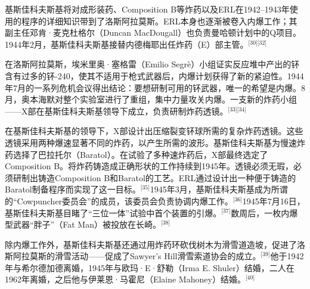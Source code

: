 基斯佳科夫斯基将对成形装药、Composition B等炸药以及ERL在1942–1943年使用的程序的详细知识带到了洛斯阿拉莫斯。ERL本身也逐渐被卷入内爆工作；其副主任邓肯·麦克杜格尔（Duncan MacDougall）也负责曼哈顿计划中的Q项目。1944年2月，基斯佳科夫斯基接替内德梅耶出任炸药（E）部主管。\(^\text{[30][32]}\)

在洛斯阿拉莫斯，埃米里奥·塞格雷（Emilio Segrè）小组证实反应堆中产出的钚含有过多的钚-240，使其不适用于枪式武器后，内爆计划获得了新的紧迫性。1944年7月的一系列危机会议得出结论：要想研制可用的钚武器，唯一的希望是内爆。8月，奥本海默对整个实验室进行了重组，集中力量攻关内爆。一支新的炸药小组——X部在基斯佳科夫斯基领导下成立，负责研制炸药透镜。\(^\text{[33][34]}\)

在基斯佳科夫斯基的领导下，X部设计出压缩裂变钚球所需的复杂炸药透镜。这些透镜采用两种爆速显著不同的炸药，以产生所需的波形。基斯佳科夫斯基为慢速炸药选择了巴拉托尔（Baratol）。在试验了多种速炸药后，X部最终选定了Composition B。将炸药铸造成正确形状的工作持续到1945年。透镜必须无瑕，必须研制出铸造Composition B和Baratol的工艺。ERL通过设计出一种便于铸造的Baratol制备程序而实现了这一目标。\(^\text{[35]}\)1945年3月，基斯佳科夫斯基成为所谓的“Cowpuncher委员会”的成员，该委员会负责协调内爆工作。\(^\text{[36]}\)1945年7月16日，基斯佳科夫斯基目睹了“三位一体”试验中首个装置的引爆。\(^\text{[37]}\)数周后，一枚内爆型武器“胖子”（Fat Man）被投放在长崎。\(^\text{[38]}\)

除内爆工作外，基斯佳科夫斯基还通过用炸药环砍伐树木为滑雪道造坡，促进了洛斯阿拉莫斯的滑雪活动——促成了Sawyer's Hill滑雪索道协会的成立。\(^\text{[39]}\)他于1942年与希尔德加德离婚，1945年与欧玛·E·舒勒（Irma E. Shuler）结婚，二人在1962年离婚，之后他与伊莱恩·马霍尼（Elaine Mahoney）结婚。\(^\text{[40]}\)
